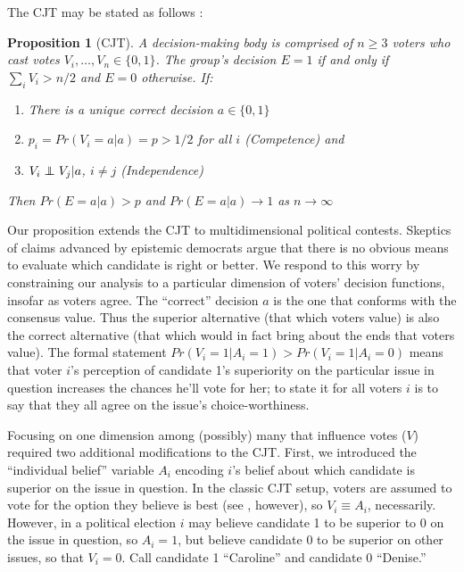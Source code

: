\documentclass[11pt]{article}
\def\independenT#1#2{\mathrel{\rlap{$#1#2$}\mkern2mu{#1#2}}}
\newcommand\independent{\protect\mathpalette{\protect\independenT}{\perp}}
\newtheorem*{prop*}{Proposition}
\begin{document}
The CJT may be stated as follows \citep[e.g.][]{boland1989majority}:
\begin{prop*}[CJT]
A decision-making body is comprised of $n\ge 3$ voters who cast votes
$V_i,\dots,V_n\in \{0,1\}$. The group's decision $E= 1$ if and only if
$\sum_i V_i>n/2$ and $E=0$ otherwise.
If:
\begin{enumerate}
\item There is a unique correct decision $a\in \{0,1\}$
\item $p_i=Pr(V_i=a|a)=p>1/2$ for all $i$ (Competence) and
\item $V_i \independent V_j|a$, $i\ne j$ (Independence)
\end{enumerate}
Then $Pr(E=a|a)>p$ and $Pr(E=a|a)\rightarrow 1$ as
$n\rightarrow\infty$
\end{prop*}

Our proposition extends the CJT to multidimensional political contests.
Skeptics of claims advanced by epistemic democrats argue that there is no obvious means to evaluate which candidate is right or better. We respond to this worry by constraining our analysis to a particular dimension of voters' decision functions, insofar as voters agree.
 The ``correct'' decision $a$ is the one that conforms with the
consensus value. Thus the superior alternative (that which voters value) is also the correct alternative (that which would in fact bring about the ends that voters value).
The formal statement $Pr(V_i=1|A_i=1) > Pr(V_i=1|A_i=0)$ means
that voter $i$'s perception of candidate 1's superiority on the
particular issue in question increases the chances he'll vote for
her; to state it for all voters $i$ is to say that they all agree on
the issue's choice-worthiness.

Focusing on one dimension among (possibly) many that influence votes ($V$)
required two additional modifications to the CJT.
First, we introduced the ``individual belief'' variable $A_i$ encoding
$i$'s belief about which candidate is superior on the issue in
question.
In the classic CJT setup, voters are assumed to vote for the option
they believe is best (see \cite{austen1996information}, however), so
$V_i\equiv A_i$, necessarily.
However, in a political election $i$ may believe candidate 1 to be
superior to 0 on the issue in question, so $A_i=1$, but believe
candidate 0 to be superior on other issues, so that $V_i=0$. Call candidate 1 ``Caroline'' and candidate 0 ``Denise.''
\end{document}
